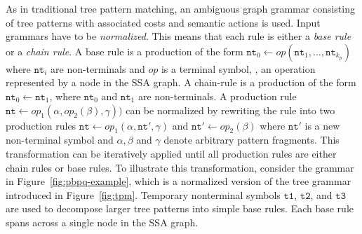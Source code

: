 As in traditional tree pattern matching, an ambiguous graph grammar
consisting of tree patterns with associated costs and semantic actions
is used. Input grammars have to be \emph{normalized}. This means that
each rule is either a \emph{base rule} or a \emph{chain rule}. A
base rule is a production of the form $\texttt{nt}_0 \leftarrow
\textit{op} ( \texttt{nt}_1, \dots, \texttt{nt}_{k_p} )$ where
$\texttt{nt}_i$ are non-terminals and $\textit{op}$ is a terminal
symbol, \ie, an operation represented by a node in the SSA graph. A
chain-rule is a production of the form $\texttt{nt}_0 \leftarrow
\texttt{nt}_1$, where $\texttt{nt}_0$ and $\texttt{nt}_1$ are
non-terminals.  A production rule $\texttt{nt} \leftarrow
\textit{op}_1 ( \alpha, \textit{op}_2 (\beta), \gamma))$ can be
normalized by rewriting the rule into two production rules
$\texttt{nt} \leftarrow \textit{op}_1 ( \alpha, \texttt{nt}' ,
\gamma)$ and $\texttt{nt}' \leftarrow \textit{op}_2 ( \beta)$ where
$\texttt{nt}'$ is a new non-terminal symbol and $\alpha,\beta$ and
$\gamma$ denote arbitrary pattern fragments.  This transformation can
be iteratively applied until all production rules are either chain
rules or base rules.
To illustrate this transformation, consider the grammar in
Figure~\ref{fig:pbpq-example}, which is a normalized version of the
tree grammar introduced in Figure~\ref{fig:tpm}. Temporary nonterminal
symbols $\texttt{t1}$, $\texttt{t2}$, and $\texttt{t3}$ are used to
decompose larger tree patterns into simple base rules. Each
base rule spans across a single node in the SSA graph.



